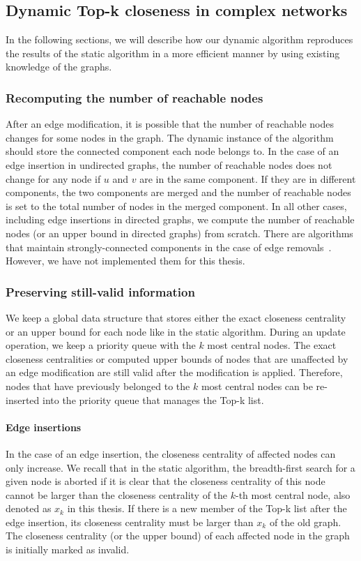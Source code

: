 \subsection{Dynamic Top-k closeness in complex networks}
\label{sec:dynamicTopKOptimizations}
In the following sections, we will describe how our dynamic algorithm reproduces the results of the static algorithm in a more efficient manner by using existing knowledge of the graphs.

\subsubsection{Recomputing the number of reachable nodes}
After an edge modification, it is possible that the number of reachable nodes changes for some nodes in the graph. The dynamic instance of the algorithm should store the connected component each node belongs to. In the case of an edge insertion in undirected graphs, the number of reachable nodes does not change for any node if $u$ and $v$ are in the same component. If they are in different components, the two components are merged and the number of reachable nodes is set to the total number of nodes in the merged component. In all other cases, including edge insertions in directed graphs, we compute the number of reachable nodes (or an upper bound in directed graphs) from scratch. There are algorithms that maintain strongly-connected components in the case of edge removals~\cite{lkacki2013improved,chechik2016decremental}. However, we have not implemented them for this thesis.

\subsubsection{Preserving still-valid information}
We keep a global data structure that stores either the exact closeness centrality or an upper bound for each node like in the static algorithm. During an update operation, we keep a priority queue with the $k$ most central nodes. The exact closeness centralities or computed upper bounds of nodes that are unaffected by an edge modification are still valid after the modification is applied. Therefore, nodes that have previously belonged to the $k$ most central nodes can be re-inserted into the priority queue that manages the Top-k list.

\paragraph{Edge insertions}
In the case of an edge insertion, the closeness centrality of affected nodes can only increase.  We recall that in the static algorithm, the breadth-first search for a given node is aborted if it is clear that the closeness centrality of this node cannot be larger than the closeness centrality of the $k$-th most central node, also denoted as $x_k$ in this thesis. If there is a new member of the Top-k list after the edge insertion, its closeness centrality must be larger than $x_k$ of the old graph. The closeness centrality (or the upper bound) of each affected node in the graph is initially marked as invalid. 

